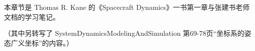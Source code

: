 本章节是 Thomas R. Kane 的《Spacecraft Dynamics》一书第一章与张建书老师文档的学习笔记。

（其中另转写了 SystemDynamicsModelingAndSimulation 第69-78页“坐标系的姿态广义坐标”的内容。）

